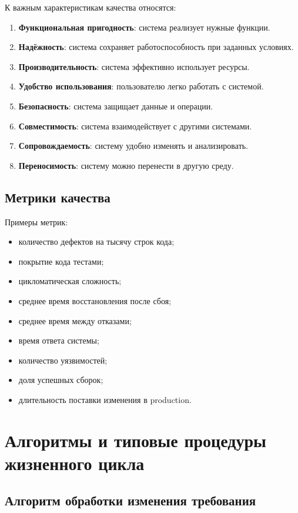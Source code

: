 \documentclass[12pt,a4paper]{article}
\begin{document}
К важным характеристикам качества относятся:
\begin{enumerate}
    \item \textbf{Функциональная пригодность}: система реализует нужные функции.
    \item \textbf{Надёжность}: система сохраняет работоспособность при заданных условиях.
    \item \textbf{Производительность}: система эффективно использует ресурсы.
    \item \textbf{Удобство использования}: пользователю легко работать с системой.
    \item \textbf{Безопасность}: система защищает данные и операции.
    \item \textbf{Совместимость}: система взаимодействует с другими системами.
    \item \textbf{Сопровождаемость}: систему удобно изменять и анализировать.
    \item \textbf{Переносимость}: систему можно перенести в другую среду.
\end{enumerate}

\subsection{Метрики качества}

Примеры метрик:
\begin{itemize}
    \item количество дефектов на тысячу строк кода;
    \item покрытие кода тестами;
    \item цикломатическая сложность;
    \item среднее время восстановления после сбоя;
    \item среднее время между отказами;
    \item время ответа системы;
    \item количество уязвимостей;
    \item доля успешных сборок;
    \item длительность поставки изменения в production.
\end{itemize}

\section{Алгоритмы и типовые процедуры жизненного цикла}

\subsection{Алгоритм обработки изменения требования}
\end{document}
